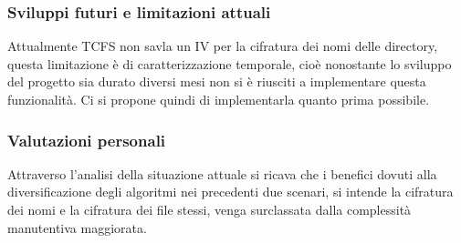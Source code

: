 \subsubsection{Sviluppi futuri e limitazioni attuali}
Attualmente TCFS non savla un IV per la cifratura dei nomi delle directory, questa limitazione è di caratterizzazione temporale, cioè nonostante lo sviluppo del progetto sia durato diversi mesi non si è riusciti a implementare questa funzionalità. Ci si propone quindi di implementarla quanto prima possibile.

\subsubsection{Valutazioni personali}
Attraverso l’analisi della situazione attuale si ricava che i benefici dovuti alla diversificazione degli algoritmi nei precedenti due scenari, si intende la cifratura dei nomi e la cifratura dei file stessi, venga surclassata dalla complessità manutentiva maggiorata.